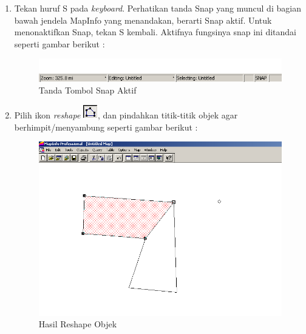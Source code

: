 \begin{enumerate}[\bfseries A.]
\begin{enumerate}[1.]
    \item Tekan huruf S pada \textit{keyboard}. Perhatikan tanda Snap yang muncul di bagian bawah jendela MapInfo yang menandakan, berarti Snap aktif. Untuk menonaktifkan Snap, tekan S kembali. Aktifnya fungsinya snap ini ditandai seperti gambar berikut :
    
    \begin{figure}[H]
      \centering
      \includegraphics[width=1\textwidth]{./resources/042-snap-aktif}
      \caption{Tanda Tombol Snap Aktif}
    \end{figure}
    
    \item Pilih ikon \textit{reshape} \includegraphics{./resources/043-ikon-reshape}, dan pindahkan titik-titik objek agar berhimpit/menyambung seperti gambar berikut :
    
    \begin{figure}[H]
      \centering
      \includegraphics[width=1\textwidth]{./resources/044-reshape-snap-ke-objek-lain}
      \caption{Hasil Reshape Objek}
    \end{figure}
  \end{enumerate}

\end{enumerate} 